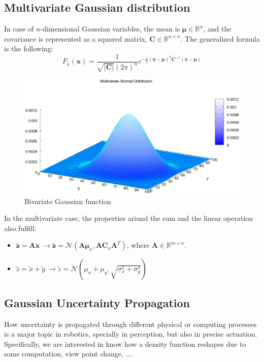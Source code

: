 \subsection{Multivariate Gaussian distribution}
\label{subsec:mulivariate_gaussian_distribution}
In case of $n$-dimensional Gaussian variables, the mean is $\boldsymbol{\mu} \in \mathbb{R}^n$, and the covariance is represented as a squared matrix, $\mathbf{C}\in\mathbb{R}^{n\times n}$. The generalized formula is the following: 
\begin{equation}
 F_{\tilde{x}}(\mathbf{x}) = \frac{1}{\sqrt{\vert \mathbf{C}\vert}(2\pi)^n}
			    e^{-\frac{1}{2}(\mathbf{x}-\boldsymbol\mu)^T\mathbf{C}^{-1}(\mathbf{x}-\boldsymbol\mu)}
\end{equation}
\begin{figure}[bth!]
  \begin{center}
    \includegraphics[width=1.0\columnwidth]{figures/mv_gaussian.eps}
    \caption{Bivariate Gaussian function}
    \label{fig:mv_gaussian}
  \end{center}
\end{figure}

In the multivariate case, the properties ariund the sum and the linear operation also fulfill: 
\begin{itemize}
 \item $\tilde{\mathbf{z}}=\mathbf{A}\tilde{\mathbf{x}} \ 
      \rightarrow \tilde{\mathbf{z}}=\mathcal{N}(\mathbf{A}\boldsymbol\mu_x,\mathbf{A}\mathbf{C}_x\mathbf{A}^T)$, 
      where $\mathbf{A}\in \mathbb{R}^{m \times n}$.
 \item $\tilde{z}=\tilde{x}+\tilde{y} \ 
      \rightarrow \tilde{z}=\mathcal{N}(\mu_x+\mu_y,\sqrt{\sigma^2_x+\sigma^2_y})$
\end{itemize}


\subsection{Gaussian Uncertainty Propagation}
How uncertainty is propagated through different physical or computing processes is a major topic in robotics, specially in perception, but also in precise actuation. Specifically, we are interested in know how a density function reshapes due to some computation, view point change, ...

